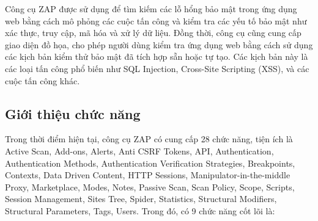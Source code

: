 Công cụ ZAP được sử dụng để tìm kiếm các lỗ hổng bảo mật trong ứng dụng web bằng cách mô phỏng các cuộc tấn công và kiểm tra các yếu tố bảo mật như xác thực, truy cập, mã hóa và xử lý dữ liệu.
Đồng thời, công cụ cũng cung cấp giao diện đồ họa, cho phép người dùng kiểm tra ứng dụng web bằng cách sử dụng các kịch bản kiểm thử bảo mật đã tích hợp sẵn hoặc tự tạo.
Các kịch bản này là các loại tấn công phổ biến như SQL Injection, Cross-Site Scripting (XSS), và các cuộc tấn công khác.

\subsection{Giới thiệu chức năng}

\tab Trong thời điểm hiện tại, công cụ ZAP có cung cấp 28 chức năng, tiện ích là Active Scan, Add-ons, Alerts, Anti CSRF Tokens, API, Authentication, Authentication Methods, Authentication Verification Strategies, Breakpoints, Contexts, Data Driven Content, HTTP Sessions, Manipulator-in-the-middle Proxy, Marketplace, Modes, Notes, Passive Scan, Scan Policy, Scope, Scripts, Session Management, Sites Tree, Spider, Statistics, Structural Modifiers, Structural Parameters, Tags, Users.
Trong đó, có 9 chức năng cốt lõi là:

